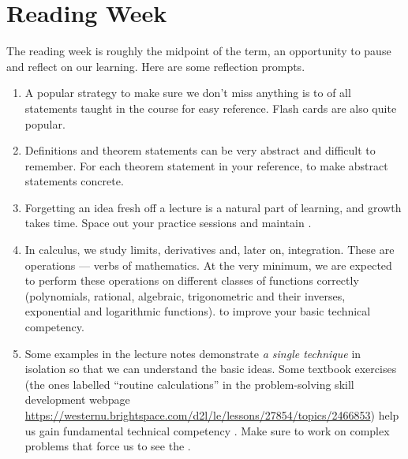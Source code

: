 \documentclass[../main.tex]{subfiles}
\begin{document}
 \section{Reading Week}
  The reading week is roughly the midpoint of the term, an opportunity to pause and reflect on our learning. Here are some reflection prompts.

  \begin{enumerate}
    \item {} A popular strategy to make sure we don't miss anything is to  of all statements taught in the course for easy reference. Flash cards are also quite popular.

    \item {} Definitions and theorem statements can be very abstract and difficult to remember. For each theorem statement in your reference,  to make abstract statements concrete.

    \item {} Forgetting an idea fresh off a lecture is a natural part of learning, and growth takes time. Space out your practice sessions and maintain .

    \item {} In calculus, we study limits, derivatives and, later on, integration. These are operations --- verbs of mathematics. At the very minimum, we are expected to perform these operations on different classes of functions correctly (polynomials, rational, algebraic, trigonometric and their inverses, exponential and logarithmic functions).  to improve your basic technical competency.

    \item {} Some examples in the lecture notes demonstrate \emph{a single technique} in isolation so that we can understand the basic ideas. Some textbook exercises (the ones labelled ``routine calculations'' in the problem-solving skill development webpage \url{https://westernu.brightspace.com/d2l/le/lessons/27854/topics/2466853}) help us gain fundamental technical competency . Make sure to work on complex problems that force us to see the .


\end{enumerate}
\end{document}
